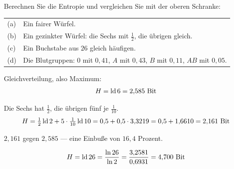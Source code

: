\begin{aufgabe}
Berechnen Sie die Entropie und vergleichen Sie mit der oberen Schranke:
\begin{center}
{\small
\renewcommand{\arraystretch}{1.4}
\begin{tabular}{@{}P{0.8cm}P{7.6cm}@{}}
\toprule
(a) & Ein fairer Würfel.\\
(b) & Ein gezinkter Würfel: die Sechs mit $\frac12$, die übrigen gleich.\\
(c) & Ein Buchstabe aus $26$ gleich häufigen.\\
(d) & Die Blutgruppen: $0$ mit $0{,}41$, $A$ mit $0{,}43$, $B$ mit $0{,}11$, $AB$ mit $0{,}05$.\\
\bottomrule
\end{tabular}}
\end{center}

\loesung
{}
Gleichverteilung, also Maximum:
\[ H = \operatorname{ld} 6 = 2{,}585 \ \text{Bit} \]

Die Sechs hat $\frac12$, die übrigen fünf je $\frac{1}{10}$.
\[ H = \tfrac12\operatorname{ld}2 + 5\cdot\tfrac1{10}\operatorname{ld}10 = 0{,}5 + 0{,}5\cdot3{,}3219 = 0{,}5+1{,}6610 = 2{,}161 \ \text{Bit} \]

 $2{,}161$ gegen $2{,}585$ --- eine Einbuße von $16{,}4$ Prozent.

\begin{center}
\begin{minipage}{0.86\textwidth}
\end{minipage}
\end{center}

\[ H = \operatorname{ld} 26 = \frac{\ln 26}{\ln 2} = \frac{3{,}2581}{0{,}6931} = 4{,}700 \ \text{Bit} \]

\begin{center}
\begin{minipage}{0.86\textwidth}
\end{minipage}
\end{center}


\end{aufgabe}
